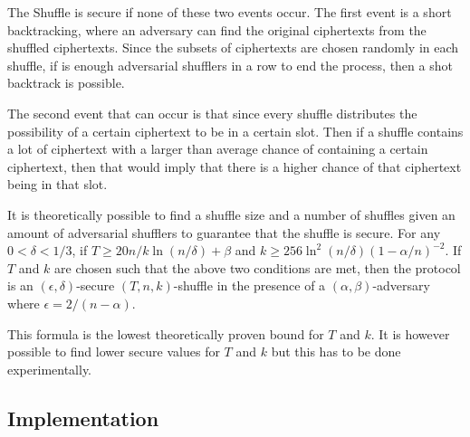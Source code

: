 The Shuffle is secure if none of these two events occur.
The first event is a short backtracking, where an adversary can find the original ciphertexts from the shuffled ciphertexts.
Since the subsets of ciphertexts are chosen randomly in each shuffle, if is enough adversarial shufflers in a row to end the process, then a shot backtrack is possible.

The second event that can occur is that since every shuffle distributes the possibility of a certain ciphertext to be in a certain slot.
Then if a shuffle contains a lot of ciphertext with a larger than average chance of containing a certain ciphertext, then that would imply that there is a higher chance of that ciphertext being in that slot.

It is theoretically possible to find a shuffle size and a number of shuffles given an amount of adversarial shufflers to guarantee that the shuffle is secure.
For any $0 < \delta < 1/3$, if $T \geq 20 n / k \ln(n/\delta) + \beta $ and $ k \geq 256 \ln^2(n/\delta)(1 - \alpha/n)^{-2}$.
If $T$ and $k$ are chosen such that the above two conditions are met, then the protocol is an $(\epsilon , \delta)$-secure $(T,n,k)$-shuffle in the presence of a $(\alpha, \beta)$-adversary where $\epsilon = 2/(n-\alpha)$.

This formula is the lowest theoretically proven bound for $T$ and $k$.
It is however possible to find lower secure values for $T$ and $k$ but this has to be done experimentally.


\subsection{Implementation}\label{subsec:approach-implementation}


